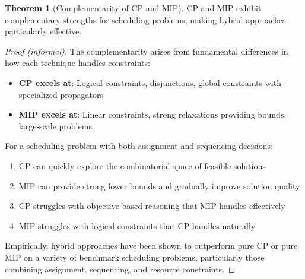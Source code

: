 \documentclass{article}
\theoremstyle{definition}
\newtheorem{theorem}{Theorem}
\begin{document}
\begin{theorem}[Complementarity of CP and MIP]
CP and MIP exhibit complementary strengths for scheduling problems, making hybrid approaches particularly effective.

\begin{proof}[Proof (informal)]
The complementarity arises from fundamental differences in how each technique handles constraints:
\begin{itemize}
    \item \textbf{CP excels at}: Logical constraints, disjunctions, global constraints with specialized propagators
    \item \textbf{MIP excels at}: Linear constraints, strong relaxations providing bounds, large-scale problems
\end{itemize}

For a scheduling problem with both assignment and sequencing decisions:
\begin{enumerate}
    \item CP can quickly explore the combinatorial space of feasible solutions
    \item MIP can provide strong lower bounds and gradually improve solution quality
    \item CP struggles with objective-based reasoning that MIP handles effectively
    \item MIP struggles with logical constraints that CP handles naturally
\end{enumerate}

Empirically, hybrid approaches have been shown to outperform pure CP or pure MIP on a variety of benchmark scheduling problems, particularly those combining assignment, sequencing, and resource constraints.
\end{proof}
\end{theorem}
\end{document}

